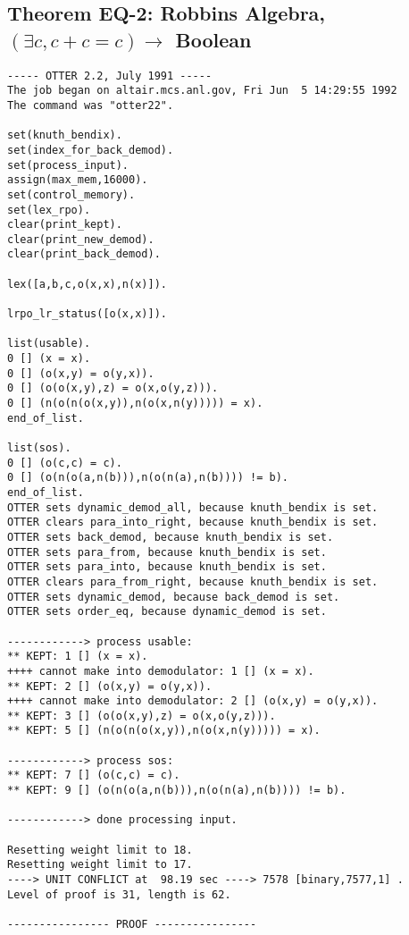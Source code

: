 \subsection{Theorem EQ-2: Robbins Algebra, $(\exists c, c+c=c) \rightarrow$ Boolean}
{\small \begin{verbatim}
----- OTTER 2.2, July 1991 -----
The job began on altair.mcs.anl.gov, Fri Jun  5 14:29:55 1992
The command was "otter22".

set(knuth_bendix).
set(index_for_back_demod).
set(process_input).
assign(max_mem,16000).
set(control_memory).
set(lex_rpo).
clear(print_kept).
clear(print_new_demod).
clear(print_back_demod).

lex([a,b,c,o(x,x),n(x)]).

lrpo_lr_status([o(x,x)]).

list(usable).
0 [] (x = x).
0 [] (o(x,y) = o(y,x)).
0 [] (o(o(x,y),z) = o(x,o(y,z))).
0 [] (n(o(n(o(x,y)),n(o(x,n(y))))) = x).
end_of_list.

list(sos).
0 [] (o(c,c) = c).
0 [] (o(n(o(a,n(b))),n(o(n(a),n(b)))) != b).
end_of_list.
OTTER sets dynamic_demod_all, because knuth_bendix is set.
OTTER clears para_into_right, because knuth_bendix is set.
OTTER sets back_demod, because knuth_bendix is set.
OTTER sets para_from, because knuth_bendix is set.
OTTER sets para_into, because knuth_bendix is set.
OTTER clears para_from_right, because knuth_bendix is set.
OTTER sets dynamic_demod, because back_demod is set.
OTTER sets order_eq, because dynamic_demod is set.

------------> process usable:
** KEPT: 1 [] (x = x).
++++ cannot make into demodulator: 1 [] (x = x).
** KEPT: 2 [] (o(x,y) = o(y,x)).
++++ cannot make into demodulator: 2 [] (o(x,y) = o(y,x)).
** KEPT: 3 [] (o(o(x,y),z) = o(x,o(y,z))).
** KEPT: 5 [] (n(o(n(o(x,y)),n(o(x,n(y))))) = x).

------------> process sos:
** KEPT: 7 [] (o(c,c) = c).
** KEPT: 9 [] (o(n(o(a,n(b))),n(o(n(a),n(b)))) != b).

------------> done processing input.

Resetting weight limit to 18.
Resetting weight limit to 17.
----> UNIT CONFLICT at  98.19 sec ----> 7578 [binary,7577,1] .
Level of proof is 31, length is 62.

---------------- PROOF ----------------


\end{verbatim}}
